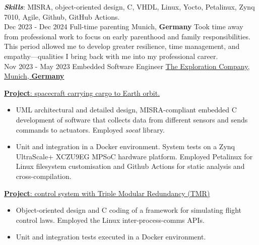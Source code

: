 \documentclass[letterpaper]{twentysecondcv} %
\begin{document}
\begin{twenty}
{            \vspace{2 mm}
            \textbf{\textit{Skills}}: MISRA, object-oriented design, C, VHDL, Linux, Yocto, Petalinux, Zynq 7010, Agile, Github, GitHub Actions.
        }\\
    \twentyitem
        {Dec 2023 -}
        {Dec 2024}
        {Full-time parenting}
        {Munich, \textbf{Germany}}
        {}
        {
            \vspace{2 mm}
            Took time away from professional work to focus on early parenthood and family responsibilities. This period allowed me to develop greater resilience, time management, and empathy—qualities I bring back with me into my professional career.
        }\\
    \twentyitem
        {Nov 2023 -}
        {May 2023}
        {Embedded Software Engineer}
        {\href{https://www.exploration.space/}{The Exploration Company, Munich, \textbf{Germany}}}
        {}
        {
            \vspace{2 mm}
            \underline{\textbf{Project}: spacecraft carrying cargo to Earth orbit.}

            \vspace{2 mm}
            \begin{itemize}
                \item UML architectural and detailed design,  MISRA-compliant embedded C development of software that collects data from different sensors and sends commands to actuators. Employed \textit{socat} library.
                \item Unit and integration in a Docker environment.  System tests on a Zynq UltraScale+ XCZU9EG MPSoC hardware platform. Employed Petalinux for Linux filesystem customisation and Github Actions for static analysis and cross-compilation.
            \end{itemize}

            \vspace{2 mm}
            \underline{\textbf{Project}: control system with Triple Modular Redundancy (TMR)}

            \vspace{2 mm}
            \begin{itemize}
                \item Object-oriented design and C coding of a framework for simulating flight control laws. Employed the Linux inter-process-comms APIs.
                \item Unit and integration tests executed in a Docker environment.
            \end{itemize}

}
\end{twenty}
\end{document}
